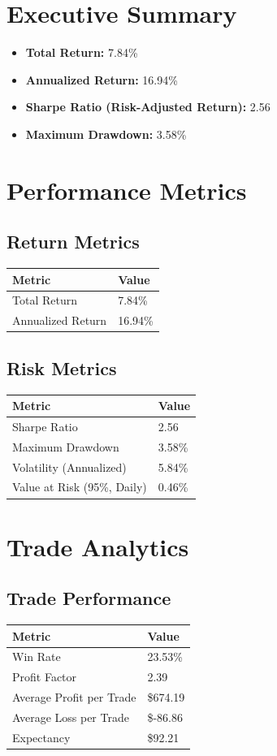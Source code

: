 \documentclass{article}
\begin{document}
\section{Executive Summary}
\begin{itemize}
    \item \textbf{Total Return:} 7.84\%
    \item \textbf{Annualized Return:} 16.94\%
    \item \textbf{Sharpe Ratio (Risk-Adjusted Return):} 2.56
    \item \textbf{Maximum Drawdown:} 3.58\%
\end{itemize}

\section{Performance Metrics}
\subsection{Return Metrics}
\begin{tabular}{ll}
    \textbf{Metric} & \textbf{Value} \\
    \hline
    Total Return & 7.84\% \\
    Annualized Return & 16.94\% \\
\end{tabular}

\subsection{Risk Metrics}
\begin{tabular}{ll}
    \textbf{Metric} & \textbf{Value} \\
    \hline
    Sharpe Ratio & 2.56 \\
    Maximum Drawdown & 3.58\% \\
    Volatility (Annualized) & 5.84\% \\
    Value at Risk (95\%, Daily) & 0.46\% \\
\end{tabular}

\section{Trade Analytics}
\subsection{Trade Performance}
\begin{tabular}{ll}
    \textbf{Metric} & \textbf{Value} \\
    \hline
    Win Rate & 23.53\% \\
    Profit Factor & 2.39 \\
    Average Profit per Trade & \$674.19 \\
    Average Loss per Trade & \$-86.86 \\
    Expectancy & \$92.21 \\
\end{tabular}
\end{document}
